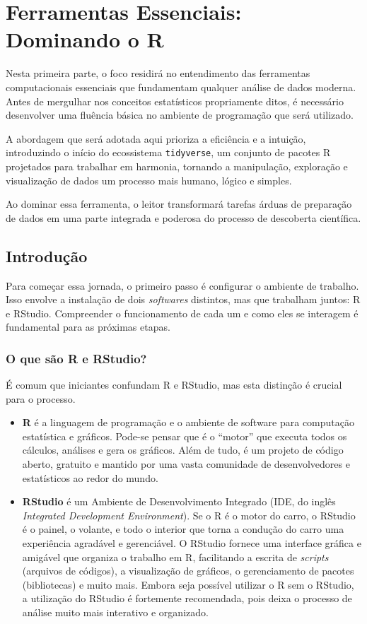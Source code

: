 \documentclass[
  12pt,
  letterpaper,
  DIV=11,
  numbers=noendperiod]{scrreprt}
\providecommand{\tightlist}{%
  \setlength{\itemsep}{0pt}\setlength{\parskip}{0pt}}\usepackage{longtable,booktabs,array}
\begin{document}
\part{Ferramentas Essenciais: Dominando o R}

Nesta primeira parte, o foco residirá no entendimento das ferramentas
computacionais essenciais que fundamentam qualquer análise de dados
moderna. Antes de mergulhar nos conceitos estatísticos propriamente
ditos, é necessário desenvolver uma fluência básica no ambiente de
programação que será utilizado.

A abordagem que será adotada aqui prioriza a eficiência e a intuição,
introduzindo o início do ecossistema \texttt{tidyverse}, um conjunto de
pacotes R projetados para trabalhar em harmonia, tornando a manipulação,
exploração e visualização de dados um processo mais humano, lógico e
simples.

Ao dominar essa ferramenta, o leitor transformará tarefas árduas de
preparação de dados em uma parte integrada e poderosa do processo de
descoberta científica.

\chapter{Introdução}\label{introduuxe7uxe3o}

Para começar essa jornada, o primeiro passo é configurar o ambiente de
trabalho. Isso envolve a instalação de dois \emph{softwares} distintos,
mas que trabalham juntos: R e RStudio. Compreender o funcionamento de
cada um e como eles se interagem é fundamental para as próximas etapas.

\section{O que são R e RStudio?}\label{o-que-suxe3o-r-e-rstudio}

É comum que iniciantes confundam R e RStudio, mas esta distinção é
crucial para o processo.

\begin{itemize}
\tightlist
\item
  \textbf{R} é a linguagem de programação e o ambiente de software para
  computação estatística e gráficos. Pode-se pensar que é o ``motor''
  que executa todos os cálculos, análises e gera os gráficos. Além de
  tudo, é um projeto de código aberto, gratuito e mantido por uma vasta
  comunidade de desenvolvedores e estatísticos ao redor do mundo.
\item
  \textbf{RStudio} é um Ambiente de Desenvolvimento Integrado (IDE, do
  inglês \emph{Integrated Development Environment}). Se o R é o motor do
  carro, o RStudio é o painel, o volante, e todo o interior que torna a
  condução do carro uma experiência agradável e gerenciável. O RStudio
  fornece uma interface gráfica e amigável que organiza o trabalho em R,
  facilitando a escrita de \emph{scripts} (arquivos de códigos), a
  visualização de gráficos, o gerenciamento de pacotes (bibliotecas) e
  muito mais. Embora seja possível utilizar o R sem o RStudio, a
  utilização do RStudio é fortemente recomendada, pois deixa o processo
  de análise muito mais interativo e organizado.
\end{itemize}
\end{document}
